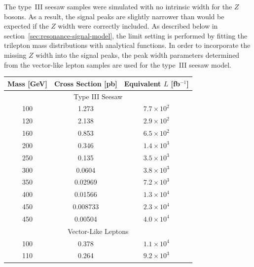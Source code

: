 The type~III seesaw samples were simulated with no intrinsic width for the $Z$ bosons. As a result, the signal peaks are slightly narrower than would be expected if the $Z$ width were correctly included. As described below in section~\ref{sec:resonance-signal-model}, the limit setting is performed by fitting the trilepton mass distributions with analytical functions. In order to incorporate the missing $Z$ width into the signal peaks, the peak width parameters determined from the vector-like lepton samples are used for the type~III seesaw model. 

\begin{table}[htbp]
	\centering
	\scriptsize
	\begin{tabular}{|c||c|c|}
		\hline
		Mass [GeV] & Cross Section [pb] & Equivalent $L$ [fb$^{-1}$] \\
		\hline
		\multicolumn{3}{|c|}{Type III Seesaw} \\
		\hline
		100	&	1.273	 &	$7.7\times10^2$ \\%
		\hline
		120	&	2.138	 &	$2.9\times10^2$ \\%
		\hline
		160	&	0.853	 &	$6.5\times10^2$ \\%
		\hline
		200	&	0.346	 &	$1.4\times10^3$ \\%
		\hline
		250	&	0.135	 &	$3.5\times10^3$ \\%
		\hline
		300	&	0.0604	 &	$3.8\times10^3$ \\%
		\hline
		350	&	0.02969	 &	$7.2\times 10^3$ \\%
		\hline
		400	&	0.01566	 &	$1.3\times10^4$ \\%
		\hline
		450	&	0.008733 &	$2.3\times10^4$ \\%
		\hline
		450	&	0.00504	 &	$4.0\times10^4$ \\%
		\hline
		\multicolumn{3}{|c|}{Vector-Like Leptons} \\
		\hline
		100	& 0.378 	 	&	$1.1\times10^4$ \\%
		\hline
		110	& 0.264 	 	&	$9.2\times10^3$ \\%

\end{tabular}
\end{table}
